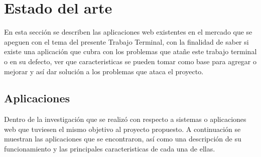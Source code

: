 \chapter{Estado del arte}


\noindent En esta sección se describen las aplicaciones web existentes en el mercado que se apeguen con el tema del presente Trabajo Terminal, con la finalidad de saber si existe una aplicación que cubra con los problemas que atañe este trabajo terminal o en su defecto, ver que caracteristicas se pueden tomar como base para agregar o mejorar y así dar solución a los problemas que ataca el proyecto. 




\section{Aplicaciones}
\noindent Dentro de la investigación que se realizó con respecto a sistemas o aplicaciones web que tuviesen el mismo objetivo al proyecto propuesto. A continuación se muestran las aplicaciones que se encontraron, así como una descripción de su funcionamiento y las principales caracteristicas de cada una de ellas.
